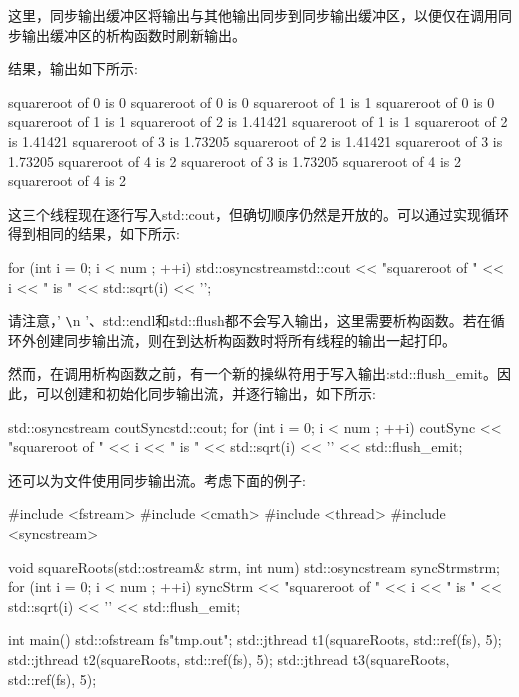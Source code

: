 这里，同步输出缓冲区将输出与其他输出同步到同步输出缓冲区，以便仅在调用同步输出缓冲区的析构函数时刷新输出。

结果，输出如下所示:

\begin{shell}
squareroot of 0 is 0
squareroot of 0 is 0
squareroot of 1 is 1
squareroot of 0 is 0
squareroot of 1 is 1
squareroot of 2 is 1.41421
squareroot of 1 is 1
squareroot of 2 is 1.41421
squareroot of 3 is 1.73205
squareroot of 2 is 1.41421
squareroot of 3 is 1.73205
squareroot of 4 is 2
squareroot of 3 is 1.73205
squareroot of 4 is 2
squareroot of 4 is 2
\end{shell}

这三个线程现在逐行写入std::cout，但确切顺序仍然是开放的。可以通过实现循环得到相同的结果，如下所示:

\begin{cpp}
for (int i = 0; i < num ; ++i) {
	std::osyncstream{std::cout} << "squareroot of " << i << " is "
								<< std::sqrt(i) << '\n';
}
\end{cpp}

请注意，' \verb|\|n '、std::endl和std::flush都不会写入输出，这里需要析构函数。若在循环外创建同步输出流，则在到达析构函数时将所有线程的输出一起打印。

然而，在调用析构函数之前，有一个新的操纵符用于写入输出:std::flush\_emit。因此，可以创建和初始化同步输出流，并逐行输出，如下所示:

\begin{cpp}
std::osyncstream coutSync{std::cout};
for (int i = 0; i < num ; ++i) {
	coutSync << "squareroot of " << i << " is "
			 << std::sqrt(i) << '\n' << std::flush_emit;
}
\end{cpp}


还可以为文件使用同步输出流。考虑下面的例子:


\begin{cpp}
#include <fstream>
#include <cmath>
#include <thread>
#include <syncstream>

void squareRoots(std::ostream& strm, int num)
{
	std::osyncstream syncStrm{strm};
	for (int i = 0; i < num ; ++i) {
		syncStrm << "squareroot of " << i << " is "
				 << std::sqrt(i) << '\n' << std::flush_emit;
	}
}

int main()
{
	std::ofstream fs{"tmp.out"};
	std::jthread t1(squareRoots, std::ref(fs), 5);
	std::jthread t2(squareRoots, std::ref(fs), 5);
	std::jthread t3(squareRoots, std::ref(fs), 5);
}
\end{cpp}

